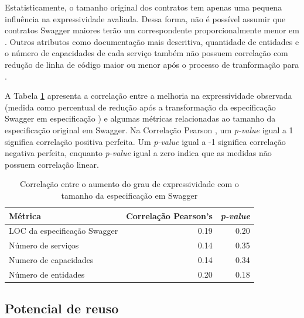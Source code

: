 Estatisticamente, o tamanho original dos contratos tem apenas uma pequena
influência na expressividade avaliada. Dessa forma, não é possível assumir que
contratos Swagger maiores terão um correspondente proporcionalmente menor em
\neoidl{}.
Outros atributos como documentação mais descritiva, quantidade de entidades e o
número de capacidades de cada serviço também não possuem correlação com redução
de linha de código maior ou menor após o processo de tranformação para
\neoidl{}.

A Tabela \ref{tab:size-corr} apresenta a correlação entre a
melhoria na expressividade observada (medida como percentual de redução após a
transformação da especificação Swagger em especificação \neoidl{}) e algumas
métricas relacionadas ao tamanho da especificação original em Swagger. Na
Correlação Pearson \cite{benesty2009pearson}, um \emph{p-value} igual a 1 significa correlação
positiva perfeita. Um \emph{p-value} igual a -1 significa correlação negativa
perfeita, enquanto \emph{p-value} igual a zero indica que as medidas não possuem
correlação linear.

% 
% 

\begin{table}[htb]
\caption{Correlação entre o aumento do grau de expressividade com o tamanho da
especificação em Swagger}
\begin{center} 
\begin{tabular}{lrr} 
\toprule
Métrica & Correlação Pearson's & \emph{p-value} \\ \hline \hline 
LOC da especificação Swagger & 0.19 &  0.20 \\ 
Número de serviços & 0.14 & 0.35 \\ 
Numero de capacidades & 0.14 & 0.34 \\
Número de entidades & 0.20 & 0.18 \\ \bottomrule 
\end{tabular} 
\end{center}
\label{tab:size-corr}
\end{table}



\subsection{Potencial de reuso}

